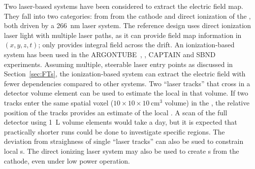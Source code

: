 

Two laser-based systems have been considered to extract the electric field map. They fall into two categories: \phel from from the \lartpc cathode and direct ionization of the , both driven by a \SI{266}{\nano\m} laser system. The reference design uses direct ionization laser light  with multiple laser paths, as it can provide field map information in $(x, y, z, t)$; \phel only provides integral field across the drift. An ionization-based system has been used in the ARGONTUBE~\cite{Zeller:2013sva}, , CAPTAIN and SBND experiments. Assuming multiple, steerable laser entry points as discussed in Section~\ref{sec:FTs}, the ionization-based system can extract the electric field with fewer dependencies compared to other systems. 
Two ``laser tracks'' that cross in a detector volume element can be used to estimate the local \efield in that volume. If two tracks enter the same spatial voxel 
($10 \times 10 \times 10~\textrm{cm}^3$ volume) in the , the relative position of the tracks provides an estimate of the local \threed \efield. A scan of the full detector using \SI{1}{L} volume elements would take a day, but it is expected that practically shorter runs could be done to investigate specific regions. 
The deviation from straighness of single ``laser tracks'' can also be sued to constrain local \efield{}s. 
The direct ionizing laser system may also be used to create \phel{}s from the cathode, even under low power operation.

